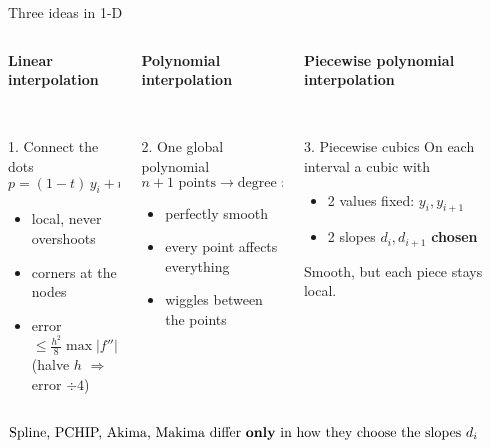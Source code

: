 \documentclass[aspectratio=169]{beamer}
\newcommand{\cbox}[2]{\colorbox{#1}{\ensuremath{\displaystyle #2}}}
\begin{document}
\begin{frame}{Three ideas in 1-D}
\begin{columns}[T]
\begin{column}{0.32\textwidth}
\centering\parbox[c][2.3em][c]{\linewidth}{\centering\color{accent}\bfseries\small Linear interpolation}\\[0.1em]\raggedright
\begin{block}{1. Connect the dots}
\footnotesize
\[ p = (1-t)\,y_i + t\,y_{i+1} \]
\begin{itemize}
\item local, never overshoots
\item corners at the nodes
\item error $\le \frac{h^2}{8}\max|f''|$\\ (halve $h$ $\Rightarrow$ error $\div 4$)
\end{itemize}
\end{block}
\end{column}
\begin{column}{0.32\textwidth}
\centering\parbox[c][2.3em][c]{\linewidth}{\centering\color{accent}\bfseries\small Polynomial interpolation}\\[0.1em]\raggedright
\begin{block}{2. One global polynomial}
\footnotesize
\[ n+1 \text{ points} \to \text{degree } n \]
\begin{itemize}
\item perfectly smooth
\item every point affects everything
\item \textcolor{hl}{wiggles} between the points
\end{itemize}
\end{block}
\end{column}
\begin{column}{0.32\textwidth}
\centering\parbox[c][2.3em][c]{\linewidth}{\centering\color{accent}\bfseries\small Piecewise polynomial interpolation}\\[0.1em]\raggedright
\begin{exampleblock}{3. Piecewise cubics}
\footnotesize
On each interval a cubic with
\begin{itemize}
\item 2 values fixed: $y_i, y_{i+1}$
\item 2 slopes $d_i, d_{i+1}$ \textbf{chosen}
\end{itemize}
Smooth, but each piece stays local.
\end{exampleblock}
\end{column}
\end{columns}
\vspace{0.8em}
\centering
\cbox{accent!12}{\text{Spline, PCHIP, Akima, Makima differ \textbf{only} in how they choose the slopes } d_i}
\end{frame}
\end{document}
